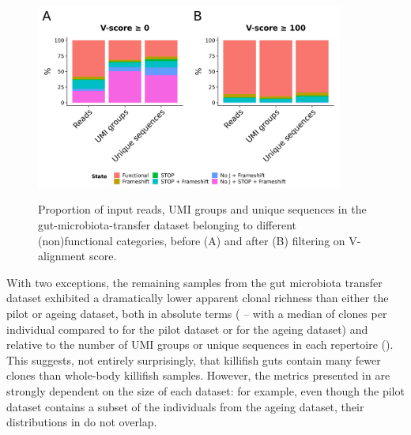 \begin{figure}
\centering
\includegraphics[width = 0.9\textwidth]{_Figures/png/gut-functional-prop}
\begin{subfigure}{0em}
\label{fig:igseq-gut-functional-prop-pre}
\end{subfigure}
\begin{subfigure}{0em}
\label{fig:igseq-gut-functional-prop-post}
\end{subfigure}
\caption{Proportion of input reads, UMI groups and unique sequences in the \igseq gut-microbiota-transfer dataset belonging to different (non)functional categories, before (A) and after (B) filtering on V-alignment score.}
\label{fig:igseq-gut-functional-prop}
\end{figure}

With two exceptions, the remaining samples from the gut microbiota transfer dataset exhibited a dramatically lower apparent clonal richness than either the pilot or ageing dataset, both in absolute terms ( -- with a median of  clones per individual compared to  for the pilot dataset or  for the ageing dataset) and relative to the number of UMI groups or unique sequences in each repertoire (). This suggests, not entirely surprisingly, that killifish guts contain many fewer clones than whole-body killifish samples. However, the metrics presented in  are strongly dependent on the size of each dataset: for example, even though the pilot dataset contains a subset of the individuals from the ageing dataset, their distributions in  do not overlap.

